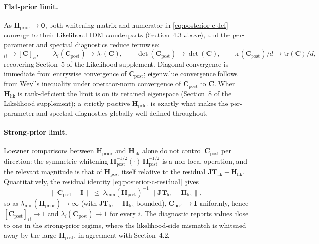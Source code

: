 \documentclass[11pt]{article}
\begin{document}
\paragraph{Flat-prior limit.}
As $\mathbf H_{\mathrm{prior}} \to \mathbf 0$, both whitening matrix and numerator in \eqref{eq:posterior-c-def} converge to their Likelihood IDM counterparts (Section~4.3 above), and the per-parameter and spectral diagnostics reduce termwise:
\begin{equation}
[\mathbf C_{\mathrm{post}}]_{ii} \to [\mathbf C]_{ii},
\qquad
\lambda_i(\mathbf C_{\mathrm{post}}) \to \lambda_i(\mathbf C),
\qquad
\det(\mathbf C_{\mathrm{post}}) \to \det(\mathbf C),
\qquad
\mathrm{tr}(\mathbf C_{\mathrm{post}})/d \to \mathrm{tr}(\mathbf C)/d,
\label{eq:posterior-c-flat-limit}
\end{equation}
recovering Section~5 of the Likelihood supplement. Diagonal convergence is immediate from entrywise convergence of $\mathbf C_{\mathrm{post}}$; eigenvalue convergence follows from Weyl's inequality under operator-norm convergence of $\mathbf C_{\mathrm{post}}$ to $\mathbf C$. When $\mathbf H_{\mathrm{lik}}$ is rank-deficient the limit is on its retained eigenspace (Section~8 of the Likelihood supplement); a strictly positive $\mathbf H_{\mathrm{prior}}$ is exactly what makes the per-parameter and spectral diagnostics globally well-defined throughout.

\paragraph{Strong-prior limit.}
Loewner comparisons between $\mathbf H_{\mathrm{prior}}$ and $\mathbf H_{\mathrm{lik}}$ alone do not control $\mathbf C_{\mathrm{post}}$ per direction: the symmetric whitening $\mathbf H_{\mathrm{post}}^{-1/2} (\cdot)\, \mathbf H_{\mathrm{post}}^{-1/2}$ is a non-local operation, and the relevant magnitude is that of $\mathbf H_{\mathrm{post}}$ itself relative to the residual $\mathbf{JT}_{\mathrm{lik}} - \mathbf H_{\mathrm{lik}}$. Quantitatively, the residual identity \eqref{eq:posterior-c-residual} gives
\begin{equation}
\|\mathbf C_{\mathrm{post}} - \mathbf I\|
\;\leq\;
\lambda_{\min}(\mathbf H_{\mathrm{post}})^{-1}\,
\bigl\|\mathbf{JT}_{\mathrm{lik}} - \mathbf H_{\mathrm{lik}}\bigr\|,
\label{eq:posterior-c-residual-bound}
\end{equation}
so as $\lambda_{\min}(\mathbf H_{\mathrm{prior}}) \to \infty$ (with $\mathbf{JT}_{\mathrm{lik}} - \mathbf H_{\mathrm{lik}}$ bounded), $\mathbf C_{\mathrm{post}} \to \mathbf I$ uniformly, hence $[\mathbf C_{\mathrm{post}}]_{ii} \to 1$ and $\lambda_i(\mathbf C_{\mathrm{post}}) \to 1$ for every $i$. The diagnostic reports values close to one in the strong-prior regime, where the likelihood-side mismatch is whitened away by the large $\mathbf H_{\mathrm{post}}$, in agreement with Section~4.2.
\end{document}
